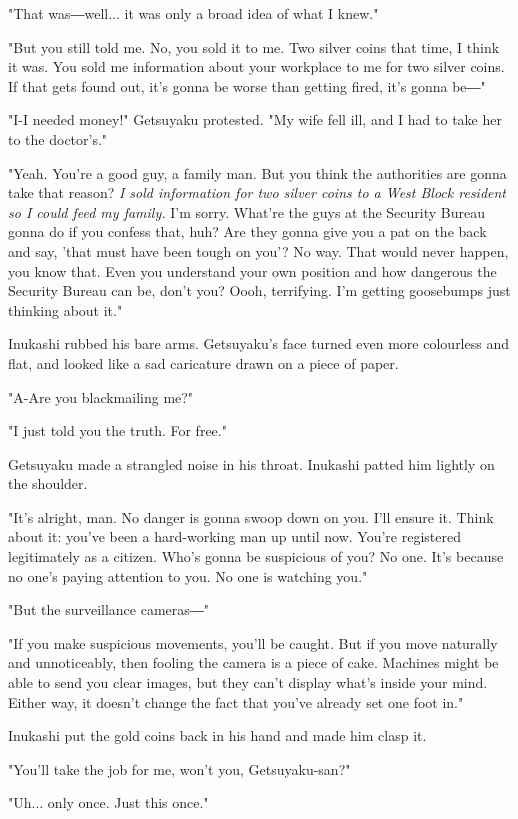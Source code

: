 "That was―well... it was only a broad idea of what I knew."

"But you still told me. No, you sold it to me. Two silver coins that
time, I think it was. You sold me information about your workplace to me
for two silver coins. If that gets found out, it's gonna be worse than
getting fired, it's gonna be―"

"I-I needed money!" Getsuyaku protested. "My wife fell ill, and I had to
take her to the doctor's."

"Yeah. You're a good guy, a family man. But you think the authorities
are gonna take that reason? \emph{I sold information for two silver coins to a
	West Block resident so I could feed my family.} I'm sorry. What're the
guys at the Security Bureau gonna do if you confess that, huh? Are they
gonna give you a pat on the back and say, 'that must have been tough on
you'? No way. That would never happen, you know that. Even you
understand your own position and how dangerous the Security Bureau can
be, don't you? Oooh, terrifying. I'm getting goosebumps just thinking
about it."

Inukashi rubbed his bare arms. Getsuyaku's face turned even more
colourless and flat, and looked like a sad caricature drawn on a piece
of paper.

"A-Are you blackmailing me?"

"I just told you the truth. For free."

Getsuyaku made a strangled noise in his throat. Inukashi patted him
lightly on the shoulder.

"It's alright, man. No danger is gonna swoop down on you. I'll ensure
it. Think about it: you've been a hard-working man up until now. You're
registered legitimately as a citizen. Who's gonna be suspicious of you?
No one. It's because no one's paying attention to you. No one is
watching you."

"But the surveillance cameras―"

"If you make suspicious movements, you'll be caught. But if you move
naturally and unnoticeably, then fooling the camera is a piece of cake.
Machines might be able to send you clear images, but they can't display
what's inside your mind. Either way, it doesn't change the fact that
you've already set one foot in."

Inukashi put the gold coins back in his hand and made him clasp it.

"You'll take the job for me, won't you, Getsuyaku-san?"

"Uh... only once. Just this once."


